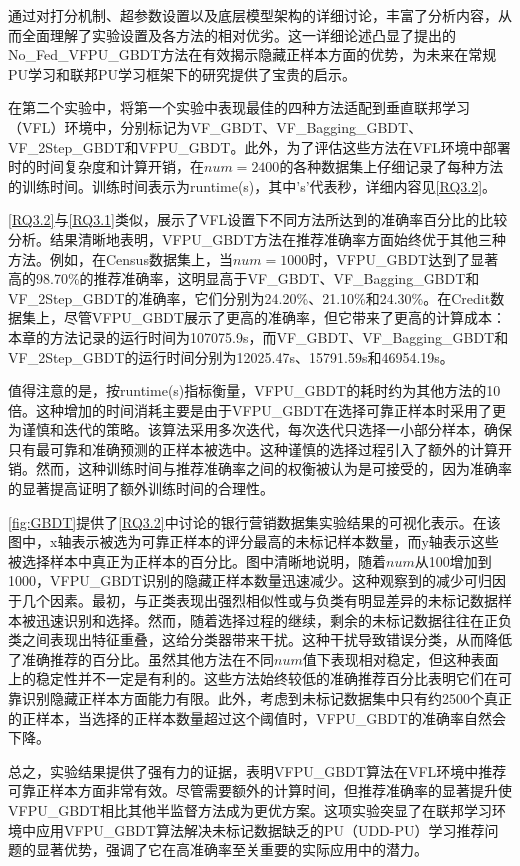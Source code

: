 通过对打分机制、超参数设置以及底层模型架构的详细讨论，丰富了分析内容，从而全面理解了实验设置及各方法的相对优劣。这一详细论述凸显了提出的No\_Fed\_VFPU\_GBDT方法在有效揭示隐藏正样本方面的优势，为未来在常规PU学习和联邦PU学习框架下的研究提供了宝贵的启示。



在第二个实验中，将第一个实验中表现最佳的四种方法适配到垂直联邦学习（VFL）环境中，分别标记为VF\_GBDT、VF\_Bagging\_GBDT、VF\_2Step\_GBDT和VFPU\_GBDT。此外，为了评估这些方法在VFL环境中部署时的时间复杂度和计算开销，在$num = 2400$的各种数据集上仔细记录了每种方法的训练时间。训练时间表示为runtime(s)，其中's'代表秒，详细内容见\autoref{RQ3.2}。

\autoref{RQ3.2}与\autoref{RQ3.1}类似，展示了VFL设置下不同方法所达到的准确率百分比的比较分析。结果清晰地表明，VFPU\_GBDT方法在推荐准确率方面始终优于其他三种方法。例如，在Census数据集上，当$num=1000$时，VFPU\_GBDT达到了显著高的98.70\%的推荐准确率，这明显高于VF\_GBDT、VF\_Bagging\_GBDT和VF\_2Step\_GBDT的准确率，它们分别为24.20\%、21.10\%和24.30\%。在Credit数据集上，尽管VFPU\_GBDT展示了更高的准确率，但它带来了更高的计算成本：本章的方法记录的运行时间为107075.9s，而VF\_GBDT、VF\_Bagging\_GBDT和VF\_2Step\_GBDT的运行时间分别为12025.47s、15791.59s和46954.19s。

值得注意的是，按runtime(s)指标衡量，VFPU\_GBDT的耗时约为其他方法的10倍。这种增加的时间消耗主要是由于VFPU\_GBDT在选择可靠正样本时采用了更为谨慎和迭代的策略。该算法采用多次迭代，每次迭代只选择一小部分样本，确保只有最可靠和准确预测的正样本被选中。这种谨慎的选择过程引入了额外的计算开销。然而，这种训练时间与推荐准确率之间的权衡被认为是可接受的，因为准确率的显著提高证明了额外训练时间的合理性。

\autoref{fig:GBDT}提供了\autoref{RQ3.2}中讨论的银行营销数据集实验结果的可视化表示。在该图中，x轴表示被选为可靠正样本的评分最高的未标记样本数量，而y轴表示这些被选择样本中真正为正样本的百分比。图中清晰地说明，随着$num$从100增加到1000，VFPU\_GBDT识别的隐藏正样本数量迅速减少。这种观察到的减少可归因于几个因素。最初，与正类表现出强烈相似性或与负类有明显差异的未标记数据样本被迅速识别和选择。然而，随着选择过程的继续，剩余的未标记数据往往在正负类之间表现出特征重叠，这给分类器带来干扰。这种干扰导致错误分类，从而降低了准确推荐的百分比。虽然其他方法在不同$num$值下表现相对稳定，但这种表面上的稳定性并不一定是有利的。这些方法始终较低的准确推荐百分比表明它们在可靠识别隐藏正样本方面能力有限。此外，考虑到未标记数据集中只有约2500个真正的正样本，当选择的正样本数量超过这个阈值时，VFPU\_GBDT的准确率自然会下降。

总之，实验结果提供了强有力的证据，表明VFPU\_GBDT算法在VFL环境中推荐可靠正样本方面非常有效。尽管需要额外的计算时间，但推荐准确率的显著提升使VFPU\_GBDT相比其他半监督方法成为更优方案。这项实验突显了在联邦学习环境中应用VFPU\_GBDT算法解决未标记数据缺乏的PU（UDD-PU）学习推荐问题的显著优势，强调了它在高准确率至关重要的实际应用中的潜力。
